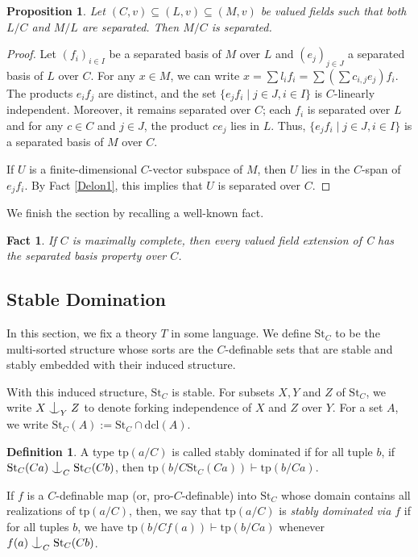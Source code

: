 \documentclass[12pt]{article}
\newcommand{\tpp}{\mathrm{tp}}
\newcommand{\dcl}{\mathrm{dcl}}
\newcommand{\val}{\textit{v}}
\newcommand{\st}{\mathrm{St}}
\newcommand{\0}{\emptyset}
\def\forkindep{\mathrel{\raise0.2ex\hbox{\ooalign{\hidewidth$\vert$\hidewidth\cr\raise-0.9ex\hbox{$\smile$}}}}}
\theoremstyle{plain}%
\newtheorem{prop}[thm]{Proposition}
\newtheorem{fact}[thm]{Fact}
\theoremstyle{definition}
\newtheorem{defn}[thm]{Definition}
\theoremstyle{remark}
\begin{document}
\begin{prop}\label{transitivity_of_separated_basis}
    Let $(C,\val) \subseteq (L,\val)\subseteq (M,\val)$ be valued fields such that both $L/C$ and $M/L$ are separated. Then $M/C$ is separated.
\end{prop}
\begin{proof}
  Let $(f_i)_{i \in I}$ be a separated basis of $M$ over $L$ and $(e_j)_{j \in J}$ a separated basis of $L$ over $C$. For any $x \in M$, we can write  $x = \sum l_i f_i = \sum \left(\sum c_{i,j} e_j\right) f_i.$ The products $e_if_j$ are distinct, and the set $\{e_j f_i \mid j \in J, i \in I\}$ is $C$-linearly independent. Moreover, it remains separated over $C$; each $f_i$ is separated over $L$ and for any $c \in C$ and $j\in J$, the product $ce_j$ lies in $L$. 
  Thus, $\{e_j f_i \mid j \in J, i \in I\}$ is a separated basis of $M$ over $C$.

If $U$ is a finite-dimensional $C$-vector subspace of $M$, then $U$ lies in the $C$-span of $e_j f_i$. By Fact \ref{Delon1}, this implies that $U$ is separated over $C$. \end{proof}

We finish the section by recalling a well-known fact.

\begin{fact}\cite[Lemma 12.2]{HHM08}\label{SepBasisMaximal}
    If $C$ is maximally complete, then every valued field extension of C has the separated basis property over $C$.
\end{fact} 



\subsection{Stable Domination}\label{stable domination}
In this section, we fix a theory $T$ in some language. We define $\st_C$ to be the multi-sorted structure whose sorts are the $C$-definable sets that are stable and stably embedded with their induced structure. 

With this induced structure, $\st_C$ is stable. For subsets $X,Y$ and $Z$ of $\st_C$, we write $X\forkindep_Y Z$ to denote forking independence of $X$ and $Z$ over $Y$. For a set $A$,  we write $\st_C(A):= \st_C\cap \dcl(A)$.

\begin{defn}
    A type $\tpp(a/C)$ is called stably dominated if for all tuple $b$, if $\st_C(Ca)\forkindep_C\st_C(Cb)$, then $\tpp(b/C\st_C(Ca))\vdash \tpp(b/Ca)$.
 
\end{defn}
If $f$ is a $C$-definable map (or, pro-$C$-definable) into $\st_C$ whose domain contains all realizations of $\tpp(a/C)$, then, we say that $\tpp(a/C)$ is \textit{stably dominated via $f$} if for all tuples $b$, we have $\tpp(b/Cf(a))\vdash \tpp(b/Ca)$ whenever $f(a)\forkindep_C\st_C(Cb)$.
\end{document}
